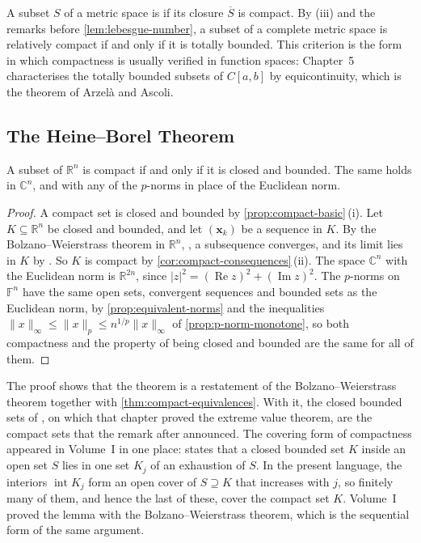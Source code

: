 A subset $S$ of a metric space is  if its closure $\overline S$ is compact. By (iii) and the remarks before \cref{lem:lebesgue-number}, a subset of a complete metric space is relatively compact if and only if it is totally bounded. This criterion is the form in which compactness is usually verified in function spaces: Chapter~5 characterises the totally bounded subsets of $C[a,b]$ by equicontinuity, which is the theorem of Arzel\`a and Ascoli.

\subsection{The Heine--Borel Theorem}

\begin{theorem}
\label{thm:heine-borel}
A subset of $\mathbb R^n$ is compact if and only if it is closed and bounded. The same holds in $\mathbb C^n$, and with any of the $p$-norms in place of the Euclidean norm.
\end{theorem}

\begin{proof}
A compact set is closed and bounded by \cref{prop:compact-basic}\,(i). Let $K\subseteq\mathbb R^n$ be closed and bounded, and let $(\mathbf x_k)$ be a sequence in $K$. By the Bolzano--Weierstrass theorem in $\mathbb R^n$, , a subsequence converges, and its limit lies in $K$ by . So $K$ is compact by \cref{cor:compact-consequences}\,(ii). The space $\mathbb C^n$ with the Euclidean norm is $\mathbb R^{2n}$, since $|z|^2=(\operatorname{Re}z)^2+(\operatorname{Im}z)^2$. The $p$-norms on $\mathbb F^n$ have the same open sets, convergent sequences and bounded sets as the Euclidean norm, by \cref{prop:equivalent-norms} and the inequalities $\|x\|_\infty\le\|x\|_p\le n^{1/p}\|x\|_\infty$ of \cref{prop:p-norm-monotone}, so both compactness and the property of being closed and bounded are the same for all of them.
\end{proof}

The proof shows that the theorem is a restatement of the Bolzano--Weierstrass theorem together with \cref{thm:compact-equivalences}. With it, the closed bounded sets of , on which that chapter proved the extreme value theorem, are the compact sets that the remark after  announced. The covering form of compactness appeared in Volume~I in one place:  states that a closed bounded set $K$ inside an open set $S$ lies in one set $K_j$ of an exhaustion of $S$. In the present language, the interiors $\operatorname{int}K_j$ form an open cover of $S\supseteq K$ that increases with $j$, so finitely many of them, and hence the last of these, cover the compact set $K$. Volume~I proved the lemma with the Bolzano--Weierstrass theorem, which is the sequential form of the same argument.

